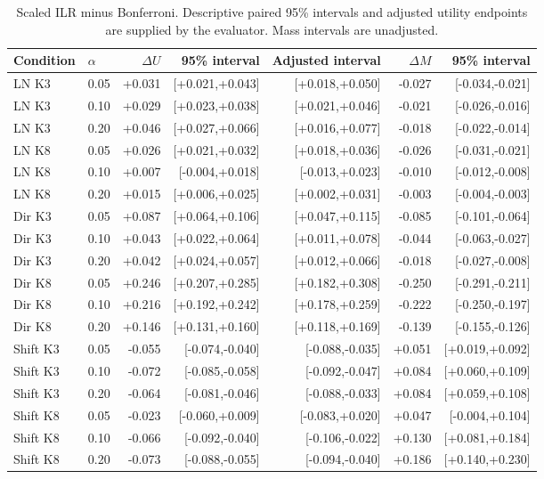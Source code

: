 \begin{table}[p]
\centering\scriptsize
\caption{Scaled ILR minus Bonferroni. Descriptive paired 95\% intervals and adjusted utility endpoints are supplied by the evaluator. Mass intervals are unadjusted.}
\begin{tabular}{llrrrrr}
\toprule
Condition & $\alpha$ & $\Delta U$ & 95\% interval & Adjusted interval & $\Delta M$ & 95\% interval \\
\midrule
LN K3 & 0.05 & +0.031 & [+0.021,+0.043] & [+0.018,+0.050] & -0.027 & [-0.034,-0.021] \\
LN K3 & 0.10 & +0.029 & [+0.023,+0.038] & [+0.021,+0.046] & -0.021 & [-0.026,-0.016] \\
LN K3 & 0.20 & +0.046 & [+0.027,+0.066] & [+0.016,+0.077] & -0.018 & [-0.022,-0.014] \\
LN K8 & 0.05 & +0.026 & [+0.021,+0.032] & [+0.018,+0.036] & -0.026 & [-0.031,-0.021] \\
LN K8 & 0.10 & +0.007 & [-0.004,+0.018] & [-0.013,+0.023] & -0.010 & [-0.012,-0.008] \\
LN K8 & 0.20 & +0.015 & [+0.006,+0.025] & [+0.002,+0.031] & -0.003 & [-0.004,-0.003] \\
Dir K3 & 0.05 & +0.087 & [+0.064,+0.106] & [+0.047,+0.115] & -0.085 & [-0.101,-0.064] \\
Dir K3 & 0.10 & +0.043 & [+0.022,+0.064] & [+0.011,+0.078] & -0.044 & [-0.063,-0.027] \\
Dir K3 & 0.20 & +0.042 & [+0.024,+0.057] & [+0.012,+0.066] & -0.018 & [-0.027,-0.008] \\
Dir K8 & 0.05 & +0.246 & [+0.207,+0.285] & [+0.182,+0.308] & -0.250 & [-0.291,-0.211] \\
Dir K8 & 0.10 & +0.216 & [+0.192,+0.242] & [+0.178,+0.259] & -0.222 & [-0.250,-0.197] \\
Dir K8 & 0.20 & +0.146 & [+0.131,+0.160] & [+0.118,+0.169] & -0.139 & [-0.155,-0.126] \\
Shift K3 & 0.05 & -0.055 & [-0.074,-0.040] & [-0.088,-0.035] & +0.051 & [+0.019,+0.092] \\
Shift K3 & 0.10 & -0.072 & [-0.085,-0.058] & [-0.092,-0.047] & +0.084 & [+0.060,+0.109] \\
Shift K3 & 0.20 & -0.064 & [-0.081,-0.046] & [-0.088,-0.033] & +0.084 & [+0.059,+0.108] \\
Shift K8 & 0.05 & -0.023 & [-0.060,+0.009] & [-0.083,+0.020] & +0.047 & [-0.004,+0.104] \\
Shift K8 & 0.10 & -0.066 & [-0.092,-0.040] & [-0.106,-0.022] & +0.130 & [+0.081,+0.184] \\
Shift K8 & 0.20 & -0.073 & [-0.088,-0.055] & [-0.094,-0.040] & +0.186 & [+0.140,+0.230] \\
\bottomrule
\end{tabular}
\end{table}
